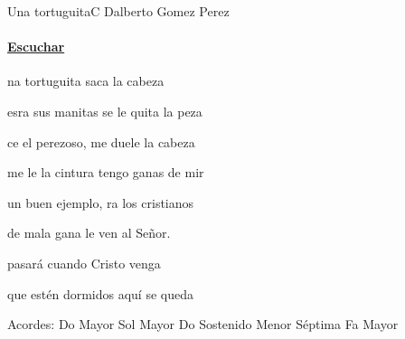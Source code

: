 \documentclass[12pt, spanish]{book}
\newcommand{\NotCCLIed}{\relax}
\begin{document}
    \begin{song}{Una tortuguita}{C}
    {\SBPubDom} %
    {Dalberto Gomez Perez}
    {} %
    {} %
        \ifChordBk
        \paragraph{\mbox{}\hfill\protect\href{https://open.spotify.com/intl-es/track/0XgjeE9k0MrDisfz7PPtPf}{Escuchar}\mbox{}\hfill}
        \fi

        \begin{SBOpGroup}
            na tortuguita saca la cabeza

            esra sus manitas se le quita la peza
        \end{SBOpGroup}

        \begin{SBOpGroup}
            ce el perezoso, me duele la cabeza

            me le la cintura tengo ganas de mir
        \end{SBOpGroup}

        \begin{SBChorus}
             un buen ejemplo, ra los cristianos

             de mala gana le ven al Señor.
        \end{SBChorus}

        \begin{SBOpGroup}
             pasará cuando Cristo venga

             que estén dormidos aquí se queda
        \end{SBOpGroup}

        \ifChordBk
        \begin{SBOpGroup}
            Acordes:
            \upchord{\C}\qquad Do Mayor  \hfill
            \upchord{\G}\qquad Sol Mayor \hfill\null\break
            \upchord{\Csmseven}Do Sostenido Menor S\'eptima \hfill
            \upchord{\F}\qquad Fa Mayor \hfill\null\break
        \end{SBOpGroup}
        \fi
    \end{song}
\end{document}
